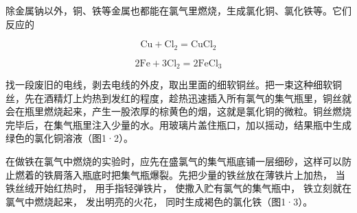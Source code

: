 除金属钠以外，铜、铁等金属也都能在氯气里燃烧，生成氯化铜、氯化铁等。它们反应的

\[
\mathrm{Cu} + \mathrm{Cl} _ {2} = \mathrm{CuCl} _ {2}
\]

\[
2 \mathrm{Fe} + 3 \mathrm{Cl} _ {2} = 2 \mathrm{FeCl} _ {3}
\]

找一段废旧的电线，剥去电线的外皮，取出里面的细软铜丝。把一束这种细软铜丝，先在酒精灯上灼热到发红的程度，趁热迅速插入所有氯气的集气瓶里，铜丝就会在瓶里燃烧起来，产生一股浓厚的棕黄色的烟，这就是氯化铜的微粒。铜丝燃烧完毕后，在集气瓶里注入少量的水。用玻璃片盖住瓶口，加以摇动，结果瓶中生成绿色的氯化铜溶液（图1·2）。

在做铁在氯气中燃烧的实验时，应先在盛氯气的集气瓶底铺一层细砂，这样可以防止燃着的铁屑落入瓶底时把集气瓶爆裂。先把少量的铁丝放在薄铁片上加热，
当铁丝绒开始红热时， 用手指轻弹铁片， 使撒入贮有氯气的集气瓶中，
铁立刻就在氯气中燃烧起来， 发出明亮的火花，
同时生成褐色的氯化铁（图1·3）。

